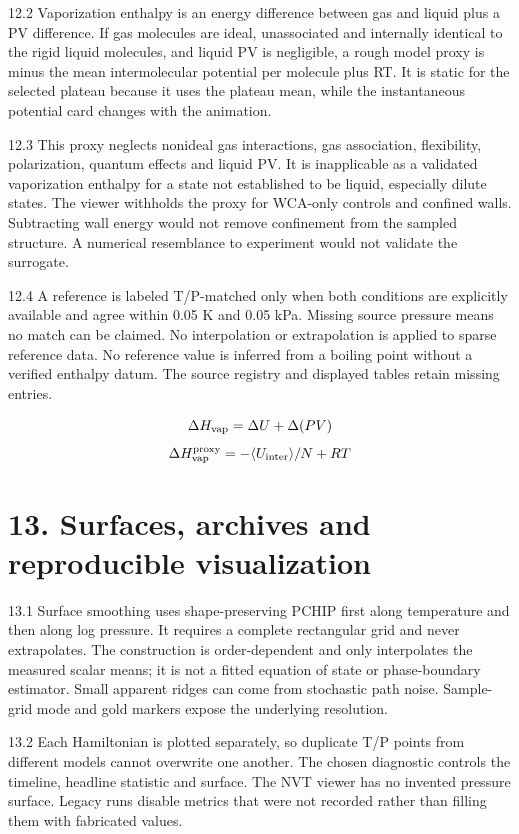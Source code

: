 \documentclass[11pt]{article}
\begin{document}
12.2 Vaporization enthalpy is an energy difference between gas and liquid plus a PV difference. If gas molecules are ideal, unassociated and internally identical to the rigid liquid molecules, and liquid PV is negligible, a rough model proxy is minus the mean intermolecular potential per molecule plus RT. It is static for the selected plateau because it uses the plateau mean, while the instantaneous potential card changes with the animation.


12.3 This proxy neglects nonideal gas interactions, gas association, flexibility, polarization, quantum effects and liquid PV. It is inapplicable as a validated vaporization enthalpy for a state not established to be liquid, especially dilute states. The viewer withholds the proxy for WCA-only controls and confined walls. Subtracting wall energy would not remove confinement from the sampled structure. A numerical resemblance to experiment would not validate the surrogate.


12.4 A reference is labeled T/P-matched only when both conditions are explicitly available and agree within 0.05 K and 0.05 kPa. Missing source pressure means no match can be claimed. No interpolation or extrapolation is applied to sparse reference data. No reference value is inferred from a boiling point without a verified enthalpy datum. The source registry and displayed tables retain missing entries.


\[\Delta H_{\rm vap}=\Delta U+\Delta(PV)\]
\[\Delta H_{\rm vap}^{\rm proxy}=-\langle U_{\rm inter}\rangle/N+RT\]
\section*{13. Surfaces, archives and reproducible visualization}
13.1 Surface smoothing uses shape-preserving PCHIP first along temperature and then along log pressure. It requires a complete rectangular grid and never extrapolates. The construction is order-dependent and only interpolates the measured scalar means; it is not a fitted equation of state or phase-boundary estimator. Small apparent ridges can come from stochastic path noise. Sample-grid mode and gold markers expose the underlying resolution.


13.2 Each Hamiltonian is plotted separately, so duplicate T/P points from different models cannot overwrite one another. The chosen diagnostic controls the timeline, headline statistic and surface. The NVT viewer has no invented pressure surface. Legacy runs disable metrics that were not recorded rather than filling them with fabricated values.
\end{document}
